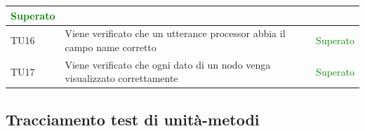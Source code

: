\documentclass[openany,12pt,a4paper]{report}
\begin{document}
\begin{longtable}{| p{2.5cm} |p{8cm} | p{2.5cm} |}
	\newline \textcolor{green}{Superato}
	\\[1em]
	\hline
	\newline TU16&
	\newline Viene verificato che un utterance processor abbia il campo name corretto&
	\newline \textcolor{green}{Superato}
	\\[1em]
	\hline
	\newline TU17&
	\newline Viene verificato che ogni dato di un nodo venga visualizzato correttamente&
	\newline \textcolor{green}{Superato}
	\\[1em]
	\hline
\end{longtable}

\subsection{Tracciamento test di unità-metodi}
\end{document}
